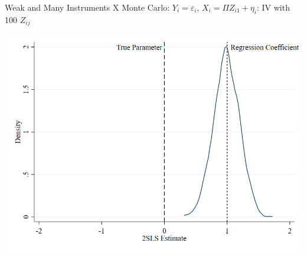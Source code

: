 \documentclass{beamer}
\begin{document}
\begin{frame}{Weak and Many Instruments X}
Monte Carlo: $Y_i=\varepsilon_i$, $X_i=\Pi Z_{i1}+\eta_i$: IV with 100 $Z_{ij}$
\begin{center}
\includegraphics[scale=0.35]{./lecture_includes/manyz.png}
\end{center}

\end{frame}
\end{document}
